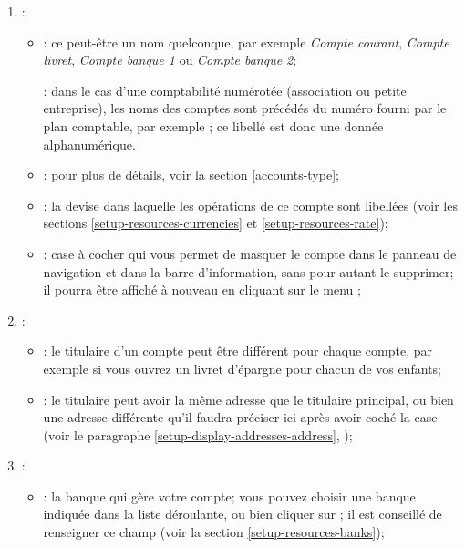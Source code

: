 \begin{enumerate}
	\item {}:
		\begin{itemize}
			\item {}: ce peut-être un nom quelconque, par exemple \emph{Compte courant}, \emph{Compte livret}, \emph{Compte banque 1} ou \emph{Compte banque 2};	

			\Note{}: dans le cas d'une comptabilité numérotée (association ou petite entreprise), les noms des comptes sont précédés du numéro fourni par le plan comptable, par exemple ; ce libellé est donc une donnée alphanumérique.

			\item {}: pour plus de détails, voir la section \vref{accounts-type};	
			\item {}: la devise dans laquelle les opérations de ce compte sont libellées (voir les sections \vref{setup-resources-currencies} et \vref{setup-resources-rate});	
			\item {}: case à cocher qui vous permet de masquer le compte dans le panneau de navigation et dans la barre d'information, sans pour autant le supprimer; il pourra être affiché à nouveau en cliquant sur le menu ;
		\end{itemize}
	\item {}:
		\begin{itemize}
			\item {}: le titulaire d'un compte peut être différent pour chaque compte, par exemple si vous ouvrez un livret d'épargne pour chacun de vos enfants;	
			\item {}: le titulaire peut avoir la même adresse que le titulaire principal, ou bien une adresse différente qu'il faudra préciser ici après avoir coché la case  (voir le paragraphe \vref{setup-display-addresses-address}, );
		\end{itemize}
	\item {}:
		\begin{itemize}
			\item {}: la banque qui gère votre compte; vous pouvez choisir une banque indiquée dans la liste déroulante, ou bien cliquer sur ; il est conseillé de renseigner ce champ (voir la section \vref{setup-resources-banks});

\end{itemize}
\end{enumerate}

